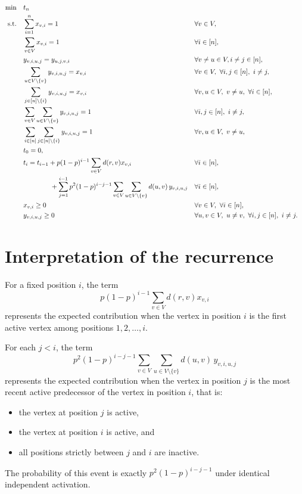 \documentclass[11pt]{article}
\begin{document}
\begin{alignat}{2}
\min \quad & t_n \label{obj}\\
\text{s.t.}\quad
& \sum_{i=1}^n x_{v,i} = 1 && \forall v \in V, \label{assign-vertex}\\
& \sum_{v \in V} x_{v,i} = 1 && \forall i \in [n], \label{assign-position}\\
& y_{v,i,u,j} = y_{u,j,v,i} && \forall v \neq u \in V, i \neq j \in [n], \label{ysym}\\
& \sum_{u \in V \setminus \{v\}} y_{v,i,u,j} = x_{v,i} && \forall v \in V,\ \forall i,j \in [n],\ i \neq j, \label{for-u}\\
& \sum_{j \in [n] \setminus \{i\}} y_{v, i, u, j} = x_{v, i} && \forall v,u \in V,\ v \neq u,\ \forall i \in [n], \label{for-j}\\
& \sum_{v \in V} \sum_{u \in V \setminus \{v\}} y_{v,i,u,j} = 1 && \forall i,j \in [n],\ i \neq j, \label{pair-total-uv}\\
& \sum_{i \in [n]} \sum_{j \in [n] \setminus \{i\}} y_{v,i,u,j} = 1 && \forall v,u \in V,\ v \neq u, \label{pair-total-ij}\\
& t_0 = 0, \label{t0}\\
& t_i = t_{i-1} + p(1-p)^{i-1}\sum_{v \in V} d(r,v)x_{v,i} 
   && \forall i \in [n], \label{ti-main}\\
& \hspace{4em} + \sum_{j=1}^{i-1} p^2(1-p)^{i-j-1}
   \sum_{v \in V}\sum_{u \in V \setminus \{v\}} d(u,v)\, y_{v,i,u,j}
   && \forall i \in [n], \notag\\
& x_{v,i} \ge 0 && \forall v \in V,\ \forall i \in [n], \label{xnonneg}\\
& y_{v,i,u,j} \ge 0 && \forall u,v \in V,\ u \neq v,\ \forall i,j \in [n],\ i \neq j. \label{ynonneg}
\end{alignat}


\section*{Interpretation of the recurrence}
For a fixed position $i$, the term
\[
p(1-p)^{i-1}\sum_{v \in V} d(r,v)x_{v,i}
\]
represents the expected contribution when the vertex in position $i$ is the first active vertex among positions $1,2,\dots,i$.

For each $j < i$, the term
\[
p^2(1-p)^{i-j-1}
\sum_{v \in V}\sum_{u \in V \setminus \{v\}} d(u,v)\, y_{v,i,u,j}
\]
represents the expected contribution when the vertex in position $j$ is the most recent active predecessor of the vertex in position $i$, that is:
\begin{itemize}[leftmargin=1.5em]
    \item the vertex at position $j$ is active,
    \item the vertex at position $i$ is active, and
    \item all positions strictly between $j$ and $i$ are inactive.
\end{itemize}
The probability of this event is exactly $p^2(1-p)^{i-j-1}$ under identical independent activation.
\end{document}
